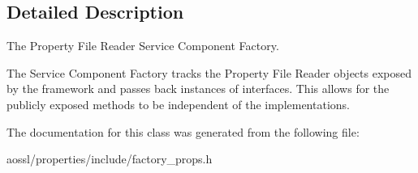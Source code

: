 \subsection{Detailed Description}
The Property File Reader Service Component Factory. 

The Service Component Factory tracks the Property File Reader objects exposed by the framework and passes back instances of interfaces. This allows for the publicly exposed methods to be independent of the implementations. 

The documentation for this class was generated from the following file\+:\begin{DoxyCompactItemize}
\item 
aossl/properties/include/factory\+\_\+props.\+h\end{DoxyCompactItemize}
